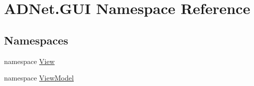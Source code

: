 \hypertarget{namespace_a_d_net_1_1_g_u_i}{}\section{A\+D\+Net.\+G\+UI Namespace Reference}
\label{namespace_a_d_net_1_1_g_u_i}
\subsection*{Namespaces}
\begin{DoxyCompactItemize}
\item 
namespace \hyperlink{namespace_a_d_net_1_1_g_u_i_1_1_view}{View}
\item 
namespace \hyperlink{namespace_a_d_net_1_1_g_u_i_1_1_view_model}{View\+Model}
\end{DoxyCompactItemize}
